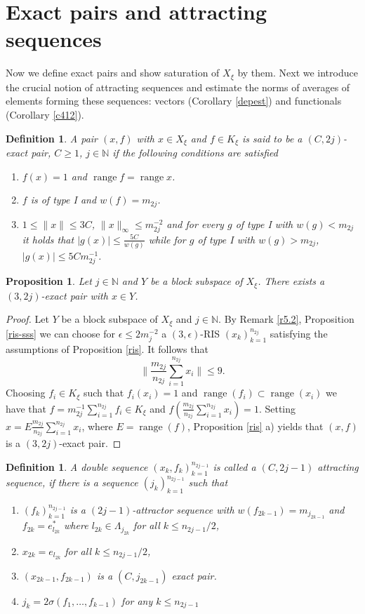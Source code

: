 \documentclass[a4paper]{amsart}
\theoremstyle{plain}
\newtheorem{proposition}[theorem]{Proposition}
\newtheorem{definition}[theorem]{Definition}
\newcommand{\N}{\mathbb{N}}
\newcommand{\e}{\epsilon}
\newcommand{\norm}[1][\cdot]{\lVert #1\rVert}
\DeclareMathOperator{\ran}{range}
\begin{document}
\section{Exact pairs and  attracting sequences}\label{sec10}
Now we define exact pairs and show saturation of $X_\xi$ by them. Next we introduce the
crucial notion of attracting sequences and estimate the norms of averages of elements
forming these sequences: vectors (Corollary \ref{depest}) and functionals (Corollary
\ref{c412}).
\begin{definition}\label{d4.8}
A pair $(x,f)$ with $x\in X_{\xi}$ and $f\in K_{\xi}$ is said to be a $(C,2j)$-exact pair, $C\geq 1$, $j\in\N$ if the following conditions are satisfied
\begin{enumerate}
\item[1)] $f(x)=1$ and $\ran f=\ran x$.
\item[2)] $f$ is  of type I and $w(f)=m_{2j}$.
\item[3)] $1\leq\norm[x]\leq 3C$, $\norm[x]_\infty\leq m_{2j}^{-2}$ and for every $g$ of type I
with $w(g)<m_{2j}$ it holds that $\vert g(x)\vert\leq \frac{5C}{w(g)}$ while for $g$ of
type I with $w(g)>m_{2j}$, $\vert g(x)\vert\leq 5Cm_{2j}^{-1}$.
\end{enumerate}
\end{definition}
\begin{proposition}\label{p4.9}
Let $j\in\N$ and  $Y$ be a block subspace of $X_{\xi}$. There exists a
$(3,2j)$-exact pair with $x\in Y$.
\end{proposition}
\begin{proof}
Let  $Y$ be a block subspace  of $X_{\xi}$ and  $j\in\N$. By Remark \ref{r5.2},
Proposition \ref{ris-sss} we can choose for $\e\leq 2m_{j}^{-2}$ a $(3,\e)$-RIS
$(x_{k})_{k=1}^{n_{2j}}$ satisfying the assumptions of Proposition \ref{ris}. It follows
that
$$
\|\frac{m_{2j}}{n_{2j}}\sum_{i=1}^{n_{2j}}x_{i}\|\leq 9.
$$
Choosing $f_{i}\in K_{\xi}$ such that $f_{i}(x_{i})=1$ and $\ran (f_i)\subset\ran (x_i)$ we have that $f=m_{2j}^{-1}\sum_{i=1}^{n_{2j}}f_{i}\in K_{\xi}$ and
$f\left(\frac{m_{2j}}{n_{2j}}\sum_{i=1}^{n_{2j}}x_{i}\right)= 1.$
Setting  $x=E\frac{m_{2j}}{n_{2j}}\sum_{i=1}^{n_{2j}}x_{i}$, where
$E=\ran(f)$,   Proposition \ref{ris} a) yields that  $(x,f)$ is a
$(3,2j)$-exact pair.
\end{proof}
\begin{definition}\label{d10.3}
A double sequence $(x_k,f_k)_{k=1}^{n_{2j-1}}$ is called a $(C,2j-1)$ attracting
sequence, if there is a sequence $(j_k)_{k=1}^{n_{2j-1}}$ such that
\begin{enumerate}
\item $(f_k)_{k=1}^{n_{2j-1}}$ is a $(2j-1)$-attractor sequence
with $w(f_{2k-1})=m_{j_{2k-1}}$ and $f_{2k}=e^*_{l_{2k}}$ where
$l_{2k}\in\Lambda_{j_{2k}}$ for all $k\leq n_{2j-1}/2$,
\item
$x_{2k}=e_{l_{2k}}$ for all $k\leq n_{2j-1}/2$,
\item
$(x_{2k-1},f_{2k-1})$ is a $(C,j_{2k-1})$ exact pair.
\item $j_k=2\sigma(f_1,\dots,f_{k-1})$ for any $k\leq n_{2j-1}$
\end{enumerate}
\end{definition}
\end{document}
